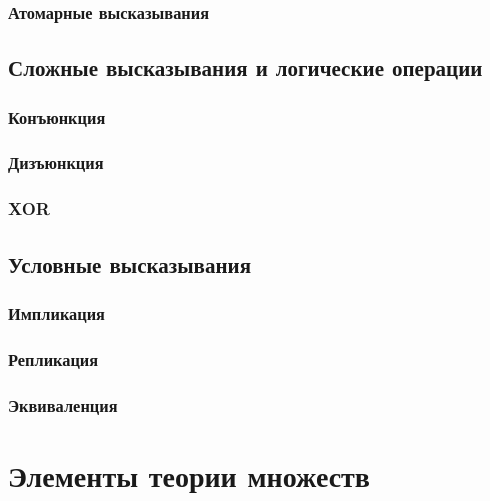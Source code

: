 \documentclass[
  letterpaper,
  DIV=11,
  numbers=noendperiod]{scrreprt}
\theoremstyle{definition}
\theoremstyle{remark}
\begin{document}
\subsection{Атомарные высказывания}\label{math-logic-utterance-atomic}

\section{Сложные высказывания и логические
операции}\label{math-logic-orepation}

\subsection{Конъюнкция}\label{math-logic-orepation-and}

\subsection{Дизъюнкция}\label{math-logic-orepation-or}

\subsection{XOR}\label{math-logic-orepation-xor}

\section{Условные высказывания}\label{math-logic-conditions}

\subsection{Импликация}\label{math-logic-conditions-implication}

\subsection{Репликация}\label{math-logic-conditions-replication}

\subsection{Эквиваленция}\label{math-logic-conditions-equivalence}


\chapter{Элементы теории множеств}\label{math-settheory}
\end{document}
